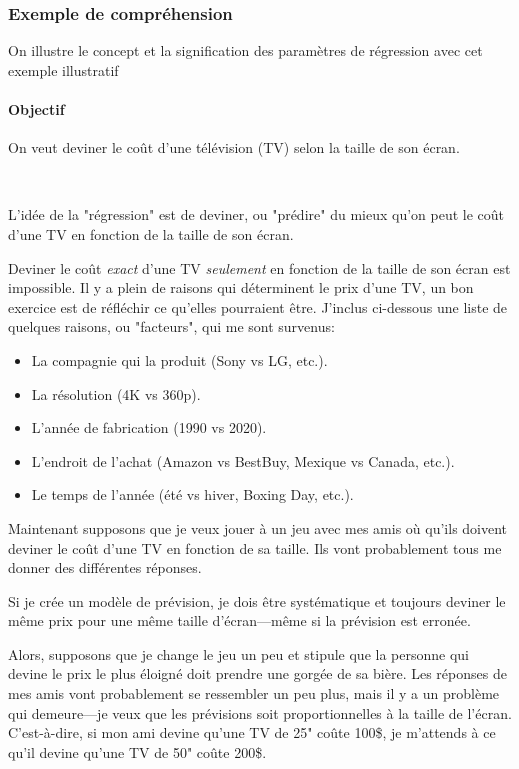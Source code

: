 \documentclass[10pt, french]{article}
\begin{document}
\begin{multicols*}{2}
\subsubsection*{Exemple de compréhension}

On illustre le concept et la signification des paramètres de régression avec cet exemple illustratif

\paragraph{Objectif}	On veut deviner le coût d'une télévision (TV) selon la taille de son écran.

\

L'idée de la "régression" est de deviner, ou "prédire" du mieux qu'on peut le coût d'une TV en fonction de la taille de son écran.

Deviner le coût \textit{exact} d'une TV \textit{seulement} en fonction de la taille de son écran est impossible. Il y a plein de raisons qui déterminent le prix d'une TV, un bon exercice est de réfléchir ce qu'elles pourraient être. 
J'inclus ci-dessous une liste de quelques raisons, ou "facteurs", qui me sont survenus:
\begin{itemize}[leftmargin = *]
	\item	La compagnie qui la produit (Sony vs LG, etc.).
	\item	La résolution (4K vs 360p).
	\item	L'année de fabrication (1990 vs 2020).
	\item	L'endroit de l'achat (Amazon vs BestBuy, Mexique vs Canada, etc.).
	\item	Le temps de l'année (été vs hiver, Boxing Day, etc.).
\end{itemize}

Maintenant supposons que je veux jouer à un jeu avec mes amis où qu'ils doivent deviner le coût d'une TV en fonction de sa taille. Ils vont probablement tous me donner des différentes réponses.

Si je crée un modèle de prévision, je dois être systématique et toujours deviner le même prix pour une même taille d'écran---même si la prévision est erronée. 

Alors, supposons que je change le jeu un peu et stipule que la personne qui devine le prix le plus éloigné doit prendre une gorgée de sa bière. Les réponses de mes amis vont probablement se ressembler un peu plus, mais il y a un problème qui demeure---je veux que les prévisions soit proportionnelles à la taille de l'écran. C'est-à-dire, si mon ami devine qu'une TV de 25" coûte 100\$, je m'attends à ce qu'il devine qu'une TV de 50" coûte 200\$.


\end{multicols*}
\end{document}
